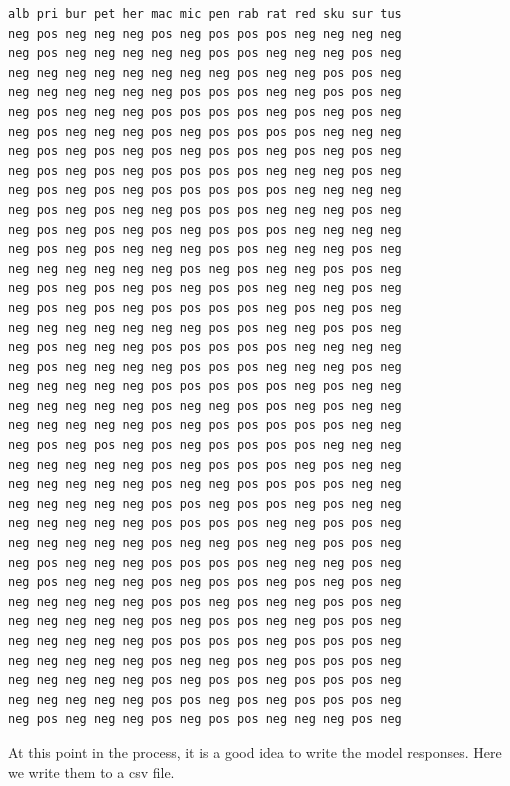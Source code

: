 \documentclass[11pt]{article}
\begin{document}
    \begin{Verbatim}[commandchars=\\\{\}]
alb pri bur pet her mac mic pen rab rat red sku sur tus
neg pos neg neg neg pos neg pos pos pos neg neg neg neg
neg pos neg neg neg neg neg pos pos neg neg neg pos neg
neg neg neg neg neg neg neg neg pos neg neg pos pos neg
neg neg neg neg neg neg pos pos pos neg neg pos pos neg
neg pos neg neg neg pos pos pos pos neg pos neg pos neg
neg pos neg neg neg pos neg pos pos pos pos neg neg neg
neg pos neg pos neg pos neg pos pos neg pos neg pos neg
neg pos neg pos neg pos pos pos pos neg neg neg pos neg
neg pos neg pos neg pos pos pos pos pos neg neg neg neg
neg pos neg pos neg neg pos pos pos neg neg neg pos neg
neg pos neg pos neg pos neg pos pos pos neg neg neg neg
neg pos neg pos neg neg neg pos pos neg neg neg pos neg
neg neg neg neg neg neg pos neg pos neg neg pos pos neg
neg pos neg pos neg pos neg pos pos neg neg neg pos neg
neg pos neg pos neg pos pos pos pos neg pos neg pos neg
neg neg neg neg neg neg neg pos pos neg neg pos pos neg
neg pos neg neg neg pos pos pos pos pos neg neg neg neg
neg pos neg neg neg neg pos pos pos neg neg neg pos neg
neg neg neg neg neg pos pos pos pos pos neg pos neg neg
neg neg neg neg neg pos neg neg pos pos neg pos neg neg
neg neg neg neg neg pos neg pos pos pos pos pos neg neg
neg pos neg pos neg pos neg pos pos pos pos neg neg neg
neg neg neg neg neg pos neg pos pos pos neg pos neg neg
neg neg neg neg neg pos neg neg pos pos pos pos neg neg
neg neg neg neg neg pos pos neg pos pos neg pos neg neg
neg neg neg neg neg pos pos pos pos neg neg pos pos neg
neg neg neg neg neg pos neg neg pos neg neg pos pos neg
neg pos neg neg neg pos pos pos pos neg neg neg pos neg
neg pos neg neg neg pos neg pos pos neg pos neg pos neg
neg neg neg neg neg pos pos neg pos neg neg pos pos neg
neg neg neg neg neg pos neg pos pos neg neg pos pos neg
neg neg neg neg neg pos pos pos pos neg pos pos pos neg
neg neg neg neg neg pos neg neg pos neg pos pos pos neg
neg neg neg neg neg pos neg pos pos neg pos pos pos neg
neg neg neg neg neg pos pos neg pos neg pos pos pos neg
neg pos neg neg neg pos neg pos pos neg neg neg pos neg

    \end{Verbatim}

    At this point in the process, it is a good idea to write the model
responses. Here we write them to a csv file.
\end{document}
